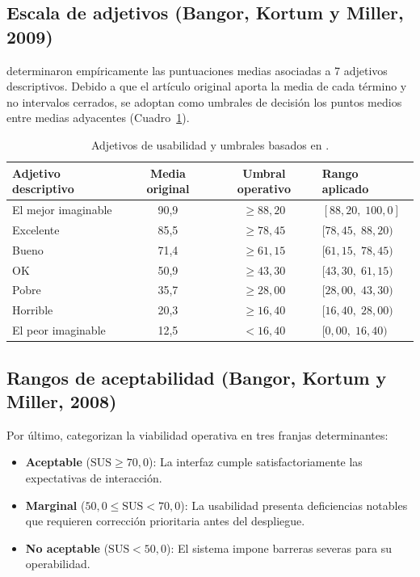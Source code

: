 \subsection{Escala de adjetivos (Bangor, Kortum y Miller, 2009)}
\textcite{Bangor2009} determinaron empíricamente las puntuaciones medias asociadas a 7 adjetivos descriptivos. Debido a que el artículo original aporta la media de cada término y no intervalos cerrados, se adoptan como umbrales de decisión los puntos medios entre medias adyacentes (Cuadro~\ref{tab:adjetivos}).

\begin{table}[htbp]
\centering
\small
\begin{tabular}{lccl}
\toprule
\textbf{Adjetivo descriptivo} & \textbf{Media original} & \textbf{Umbral operativo} & \textbf{Rango aplicado} \\
\midrule
El mejor imaginable & 90{,}9 & $\ge 88{,}20$ & $[88{,}20,\; 100{,}0]$ \\
Excelente           & 85{,}5 & $\ge 78{,}45$ & $[78{,}45,\; 88{,}20)$ \\
Bueno               & 71{,}4 & $\ge 61{,}15$ & $[61{,}15,\; 78{,}45)$ \\
OK                  & 50{,}9 & $\ge 43{,}30$ & $[43{,}30,\; 61{,}15)$ \\
Pobre               & 35{,}7 & $\ge 28{,}00$ & $[28{,}00,\; 43{,}30)$ \\
Horrible            & 20{,}3 & $\ge 16{,}40$ & $[16{,}40,\; 28{,}00)$ \\
El peor imaginable  & 12{,}5 & $< 16{,}40$   & $[0{,}00,\; 16{,}40)$  \\
\bottomrule
\end{tabular}
\caption{Adjetivos de usabilidad y umbrales basados en \textcite{Bangor2009}.}
\label{tab:adjetivos}
\end{table}

\subsection{Rangos de aceptabilidad (Bangor, Kortum y Miller, 2008)}
Por último, \textcite{Bangor2008} categorizan la viabilidad operativa en tres franjas determinantes:
\begin{itemize}
    \item \textbf{Aceptable} ($\text{SUS} \ge 70{,}0$): La interfaz cumple satisfactoriamente las expectativas de interacción.
    \item \textbf{Marginal} ($50{,}0 \le \text{SUS} < 70{,}0$): La usabilidad presenta deficiencias notables que requieren corrección prioritaria antes del despliegue.
    \item \textbf{No aceptable} ($\text{SUS} < 50{,}0$): El sistema impone barreras severas para su operabilidad.
\end{itemize}

